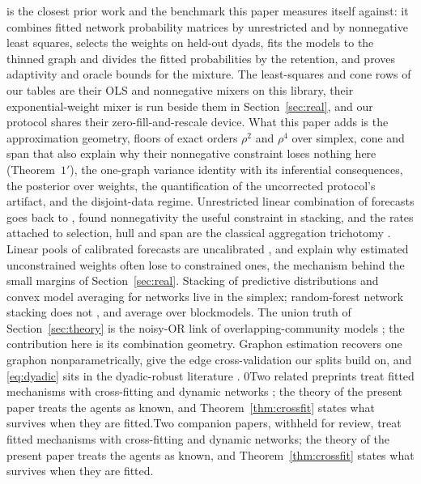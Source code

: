 \documentclass[12pt]{article}
\newcommand{\blind}{0}
\begin{document}
\citet{LiLe2024} is the closest prior work and the benchmark this paper measures itself against: it combines fitted network probability matrices by unrestricted and by nonnegative least squares, selects the weights on held-out dyads, fits the models to the thinned graph and divides the fitted probabilities by the retention, and proves adaptivity and oracle bounds for the mixture. The least-squares and cone rows of our tables are their OLS and nonnegative mixers on this library, their exponential-weight mixer is run beside them in Section~\ref{sec:real}, and our protocol shares their zero-fill-and-rescale device. What this paper adds is the approximation geometry, floors of exact orders $\rho^2$ and $\rho^4$ over simplex, cone and span that also explain why their nonnegative constraint loses nothing here (Theorem~$1'$), the one-graph variance identity with its inferential consequences, the posterior over weights, the quantification of the uncorrected protocol's artifact, and the disjoint-data regime. Unrestricted linear combination of forecasts goes back to \citet{GrangerRamanathan1984}, \citet{Breiman1996} found nonnegativity the useful constraint in stacking, and the rates attached to selection, hull and span are the classical aggregation trichotomy \citep{Tsybakov2003, BuneaTsybakovWegkamp2007}. Linear pools of calibrated forecasts are uncalibrated \citep{GenestZidek1986, GneitingRaftery2007, RanjanGneiting2010, GneitingRanjan2013}, and \citet{Claeskens2016} explain why estimated unconstrained weights often lose to constrained ones, the mechanism behind the small margins of Section~\ref{sec:real}. Stacking of predictive distributions \citep{YaoEtAl2018} and convex model averaging for networks \citep{Heo2025, zhang2025network} live in the simplex; random-forest network stacking does not \citep{GhasemianEtAl2020, HeEtAl2024}, and \citet{LatoucheRobin2016} average over blockmodels. The union truth of Section~\ref{sec:theory} is the noisy-OR link of overlapping-community models \citep{LatoucheBirmeleAmbroise2011, BallKarrerNewman2011, VallesCatala2016}; the contribution here is its combination geometry. Graphon estimation \citep{OlhedeWolfe2014, GaoLuZhou2015, Chatterjee2015, KloppTsybakovVerzelen2017} recovers one graphon nonparametrically, \citet{LiLevinaZhu2020} give the edge cross-validation our splits build on, and \eqref{eq:dyadic} sits in the dyadic-robust literature \citep{AronowSamiiAssenova2015, Graham2020}. \blind Two related preprints treat fitted mechanisms with cross-fitting \citep{PapamichalisRuane2026minimax} and dynamic networks \citep{PapamichalisRuaneEtAl2026dynamic}; the theory of the present paper treats the agents as known, and Theorem~\ref{thm:crossfit} states what survives when they are fitted.\else Two companion papers, withheld for review, treat fitted mechanisms with cross-fitting and dynamic networks; the theory of the present paper treats the agents as known, and Theorem~\ref{thm:crossfit} states what survives when they are fitted.\fi
\end{document}
